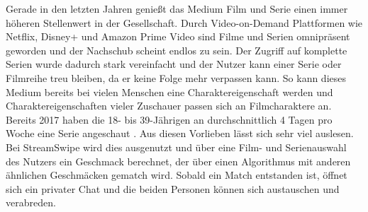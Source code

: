 Gerade in den letzten Jahren genießt das Medium Film und Serie einen immer höheren Stellenwert in der Gesellschaft. Durch Video-on-Demand Plattformen wie Netflix, Disney+ und Amazon Prime Video  sind Filme und Serien omnipräsent geworden und der Nachschub scheint endlos zu sein. Der Zugriff auf komplette Serien wurde dadurch stark vereinfacht und der Nutzer kann einer Serie oder Filmreihe treu bleiben, da er keine Folge mehr verpassen kann. So kann dieses Medium bereits bei vielen Menschen eine Charaktereigenschaft werden und Charaktereigenschaften vieler Zuschauer passen sich an Filmcharaktere an.\\
Bereits 2017 haben die 18- bis 39-Jährigen an durchschnittlich 4 Tagen pro Woche eine Serie angeschaut \cite{serienkonsum}. Aus diesen Vorlieben lässt sich sehr viel auslesen. Bei StreamSwipe wird dies ausgenutzt und über eine Film- und Serienauswahl des Nutzers ein Geschmack berechnet, der über einen Algorithmus mit anderen ähnlichen Geschmäcken gematch wird. Sobald ein Match entstanden ist, öffnet sich ein privater Chat und die beiden Personen können sich austauschen und verabreden.